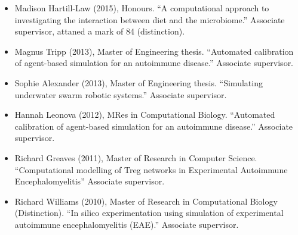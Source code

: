 \documentclass[a4paper]{article}
\begin{document}
\begin{itemize}


\item Madison Hartill-Law (2015), Honours. ``A computational approach to investigating the interaction between diet and the microbiome.''  Associate supervisor, attaned a mark of 84 (distinction).


\item Magnus Tripp (2013), Master of Engineering thesis. ``Automated calibration of agent-based simulation for an autoimmune disease.'' Associate supervisor.

\item Sophie Alexander (2013), Master of Engineering thesis. ``Simulating underwater swarm robotic systems.'' Associate supervisor.

\item Hannah Leonova (2012), MRes in Computational Biology. ``Automated calibration of agent-based simulation for an autoimmune disease.'' Associate supervisor.



\item Richard Greaves (2011), Master of Research in Computer Science. ``Computational modelling of Treg networks in Experimental Autoimmune Encephalomyelitis'' Associate supervisor.

\item Richard Williams (2010), Master of Research in Computational Biology (Distinction). ``In silico experimentation using simulation of experimental autoimmune encephalomyelitis (EAE).'' Associate supervisor.
\end{itemize}
\end{document}
